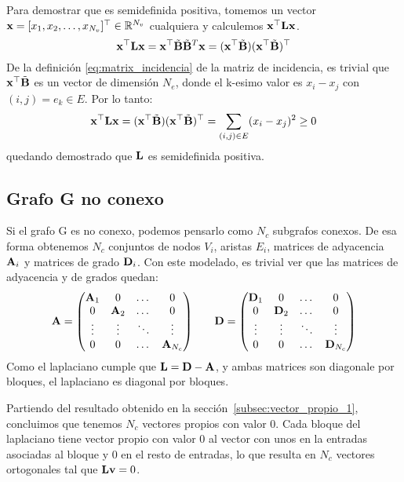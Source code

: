 \documentclass{article}
\begin{document}
Para demostrar que es semidefinida positiva, tomemos un vector $\mathbf{x} = [x_1, x_2, \dots, x_{N_v}]^\top \in \mathbb{R}^{N_v}$
cualquiera y calculemos $\mathbf{x}^\top\mathbf{L}\mathbf{x}$.
\begin{equation*}
    \mathbf{x}^\top\mathbf{L}\mathbf{x} = \mathbf{x}^\top \tilde{\mathbf{B}}\tilde{\mathbf{B}}^T\mathbf{x} = (\mathbf{x}^\top\tilde{\mathbf{B}})(\mathbf{x}^\top\tilde{\mathbf{B}})^\top
\end{equation*}
De la definición \eqref{eq:matrix_incidencia} de la matriz de incidencia, es trivial que $\mathbf{x}^\top \tilde{\mathbf{B}}$ es un vector de dimensión $N_e$, donde el k-esimo valor es $x_i-x_j$ con $(i,j) = e_k \in E$.  Por lo tanto:
\begin{equation}
    \mathbf{x}^\top\mathbf{L}\mathbf{x} = (\mathbf{x}^\top\tilde{\mathbf{B}})(\mathbf{x}^\top\tilde{\mathbf{B}})^\top = \sum_{(i,j)\in E} (x_i-x_j)^2 \geq 0
\end{equation}
quedando demostrado que $\mathbf{L}$ es semidefinida positiva.

\subsection{Grafo G no conexo}

Si el grafo G es no conexo, podemos pensarlo como $N_c$ subgrafos conexos. De esa forma
obtenemos $N_c$ conjuntos de nodos $V_i$, aristas $E_i$, matrices de adyacencia $\mathbf{A}_i$ y matrices de grado $\mathbf{D}_i$. Con este modelado, es trivial ver que las matrices de adyacencia y de grados quedan:
\begin{equation*}
    \begin{array}{l c r}
        \mathbf{A} = \left(\begin{matrix}
            \mathbf{A}_1 & 0 & \dots & 0 \\
            0 & \mathbf{A}_2 & \dots & 0 \\
            \vdots & \vdots & \ddots & \vdots \\
            0 & 0 & \dots & \mathbf{A}_{N_c}
        \end{matrix}\right) 
        & &
        \mathbf{D} =\left(\begin{matrix}
             \mathbf{D}_1 & 0 & \dots & 0 \\
            0 & \mathbf{D}_2 & \dots & 0 \\
            \vdots & \vdots & \ddots & \vdots \\
            0 & 0 & \dots & \mathbf{D}_{N_c}
        \end{matrix}\right)
    \end{array}
\end{equation*}
Como el laplaciano cumple que $\mathbf{L} = \mathbf{D} - \mathbf{A}$, y ambas matrices son diagonale por bloques, el laplaciano es diagonal por bloques. 

Partiendo del resultado obtenido en la sección~\ref{subsec:vector_propio_1}, concluimos que tenemos $N_c$ vectores propios con valor 0. Cada bloque del laplaciano tiene vector propio con valor 0 al vector con unos en la entradas asociadas al bloque y 0 en el resto de entradas, lo que resulta en $N_c$ vectores ortogonales tal que $\mathbf{L} \mathbf{v} = 0$.
\end{document}

